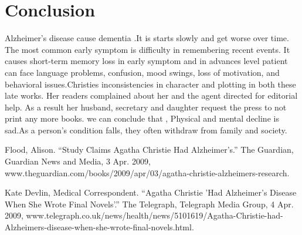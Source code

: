 \documentclass[journal, a4paper]{IEEEtran}
\begin{document}
\section{Conclusion}
	Alzheimer’s disease cause dementia .It is starts slowly and get worse over time. The most common early symptom is difficulty in remembering recent events. It causes short-term memory loss in early symptom and in advances level patient can face language problems, confusion, mood swings, loss of motivation, and behavioral issues.Christies inconsistencies in character and plotting in both these late works. Her readers complained about her and the agent directed for editorial help. As a result her husband, secretary and daughter request the press to not print any more books. we can conclude that , Physical and mental decline is sad.As a person’s condition falls, they often withdraw from family and society.

\begin{thebibliography}{5}

	Flood, Alison. “Study Claims Agatha Christie Had Alzheimer's.” The Guardian, Guardian News and Media, 3 Apr. 2009, www.theguardian.com/books/2009/apr/03/agatha-christie-alzheimers-research.

	\bibitem
Kate Devlin, Medical Correspondent. “Agatha Christie 'Had Alzheimer's Disease When She Wrote Final Novels'.” The Telegraph, Telegraph Media Group, 4 Apr. 2009, www.telegraph.co.uk/news/health/news/5101619/Agatha-Christie-had-Alzheimers-disease-when-she-wrote-final-novels.html.
\end{thebibliography}
\end{document}
